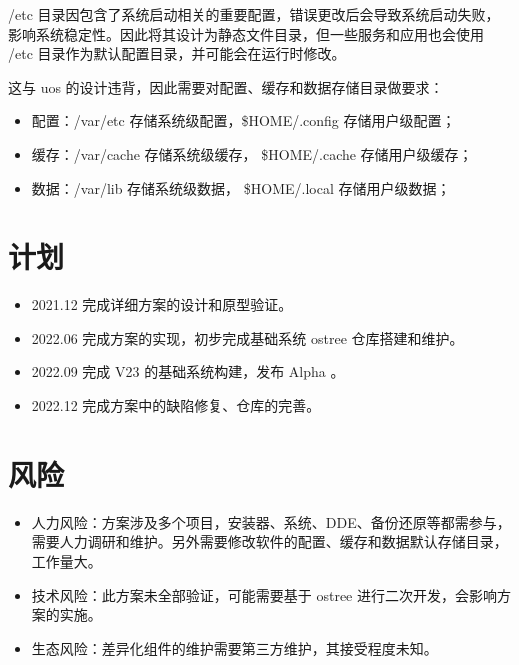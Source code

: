 \documentclass{utart}
\begin{document}
/etc 目录因包含了系统启动相关的重要配置，错误更改后会导致系统启动失败，影响系统稳定性。因此将其设计为静态文件目录，但一些服务和应用也会使用 /etc 目录作为默认配置目录，并可能会在运行时修改。

这与 uos 的设计违背，因此需要对配置、缓存和数据存储目录做要求：
\begin{itemize}
\item 配置：/var/etc 存储系统级配置，\$HOME/.config 存储用户级配置；
\item 缓存：/var/cache 存储系统级缓存， \$HOME/.cache 存储用户级缓存；
\item 数据：/var/lib 存储系统级数据， \$HOME/.local 存储用户级数据；
\end{itemize}

\section{计划}
\begin{itemize}[leftmargin=4em]
\item 2021.12 完成详细方案的设计和原型验证。
\item 2022.06 完成方案的实现，初步完成基础系统 ostree 仓库搭建和维护。
\item 2022.09 完成 V23 的基础系统构建，发布 Alpha 。
\item 2022.12 完成方案中的缺陷修复、仓库的完善。
\end{itemize}

\section{风险}
\begin{itemize}[leftmargin=4em]
\item 人力风险：方案涉及多个项目，安装器、系统、DDE、备份还原等都需参与，需要人力调研和维护。另外需要修改软件的配置、缓存和数据默认存储目录，工作量大。
\item 技术风险：此方案未全部验证，可能需要基于 ostree 进行二次开发，会影响方案的实施。
\item 生态风险：差异化组件的维护需要第三方维护，其接受程度未知。
\end{itemize}
\end{document}
